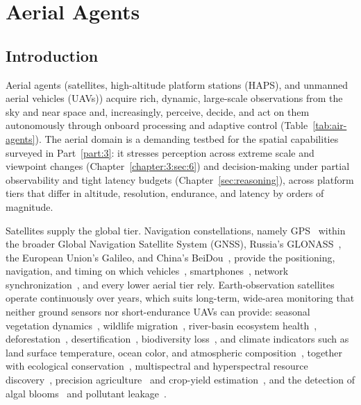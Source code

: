 \section{Aerial Agents}
\label{sec:p4_s9_4}



\subsection{Introduction}
\label{subsec:p4-sec9-4-introduction}


Aerial agents (satellites, high-altitude platform stations (HAPS), and unmanned aerial vehicles (UAVs)) acquire rich, dynamic, large-scale observations from the sky and near space and, increasingly, perceive, decide, and act on them autonomously through onboard processing and adaptive control (Table~\ref{tab:air-agents}).
The aerial domain is a demanding testbed for the spatial capabilities surveyed in Part~\ref{part:3}: it stresses perception across extreme scale and viewpoint changes (Chapter~\ref{chapter:3:sec:6}) and decision-making under partial observability and tight latency budgets (Chapter~\ref{sec:reasoning}), across platform tiers that differ in altitude, resolution, endurance, and latency by orders of magnitude.

Satellites supply the global tier. Navigation constellations, namely GPS~\cite{enge1994global,leick2015gps} within the broader Global Navigation Satellite System (GNSS), Russia's GLONASS~\cite{ivanov1992glonass}, the European Union's Galileo, and China's BeiDou~\cite{yang2019introduction,yang2020basic}, provide the positioning, navigation, and timing on which vehicles~\cite{li2022real}, smartphones~\cite{zangenehnejad2021gnss}, network synchronization~\cite{hasan2018gnss}, and every lower aerial tier rely.
Earth-observation satellites operate continuously over years, which suits long-term, wide-area monitoring that neither ground sensors nor short-endurance UAVs can provide: seasonal vegetation dynamics~\cite{malingreau1986global}, wildlife migration~\cite{dobrynin2017integration}, river-basin ecosystem health~\cite{ferreira2013estimating}, deforestation~\cite{tucker2000strategies,finer2018combating}, desertification~\cite{del1998status,collado2002satellite}, biodiversity loss~\cite{turner2015free}, and climate indicators such as land surface temperature, ocean color, and atmospheric composition~\cite{yang2013role,kaufman2002satellite}, together with ecological conservation~\cite{pettorelli2014satellite,boyle2014high}, multispectral and hyperspectral resource discovery~\cite{pettorelli2019satellite}, precision agriculture~\cite{guo2018multi} and crop-yield estimation~\cite{maas1988using,ferencz2004crop}, and the detection of algal blooms~\cite{fang2022global} and pollutant leakage~\cite{pandey2019satellite}.

